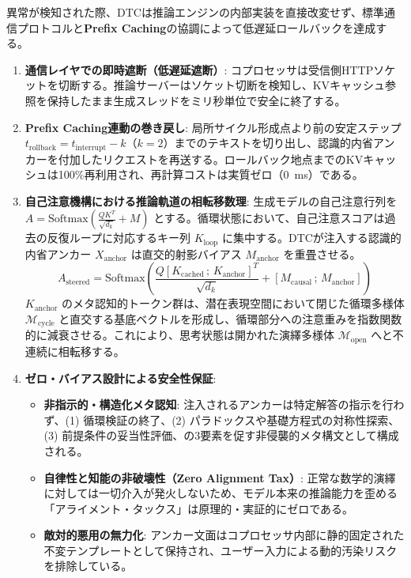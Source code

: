 \documentclass[11pt,a4paper]{article}
\begin{document}
異常が検知された際、DTCは推論エンジンの内部実装を直接改変せず、標準通信プロトコルと\textbf{Prefix Caching}の協調によって低遅延ロールバックを達成する。
\begin{enumerate}
    \item \textbf{通信レイヤでの即時遮断（低遅延遮断）}: コプロセッサは受信側HTTPソケットを切断する。推論サーバーはソケット切断を検知し、KVキャッシュ参照を保持したまま生成スレッドをミリ秒単位で安全に終了する。
    \item \textbf{Prefix Caching連動の巻き戻し}: 局所サイクル形成点より前の安定ステップ $t_{\mathrm{rollback}} = t_{\mathrm{interrupt}} - k$（$k=2$）までのテキストを切り出し、認識的内省アンカーを付加したリクエストを再送する。ロールバック地点までのKVキャッシュは100\%再利用され、再計算コストは実質ゼロ（0~ms）である。
    \item \textbf{自己注意機構における推論軌道の相転移数理}: 生成モデルの自己注意行列を $A = \mathrm{Softmax}\left(\frac{QK^T}{\sqrt{d_k}} + M\right)$ とする。循環状態において、自己注意スコアは過去の反復ループに対応するキー列 $K_{\mathrm{loop}}$ に集中する。DTCが注入する認識的内省アンカー $X_{\mathrm{anchor}}$ は直交的射影バイアス $M_{\mathrm{anchor}}$ を重畳させる。
    \begin{equation}
    A_{\mathrm{steered}} = \mathrm{Softmax}\left(\frac{Q [K_{\mathrm{cached}} \,;\, K_{\mathrm{anchor}}]^T}{\sqrt{d_k}} + [M_{\mathrm{causal}} \,;\, M_{\mathrm{anchor}}]\right)
    \end{equation}
    $K_{\mathrm{anchor}}$ のメタ認知的トークン群は、潜在表現空間において閉じた循環多様体 $\mathcal{M}_{\mathrm{cycle}}$ と直交する基底ベクトルを形成し、循環部分への注意重みを指数関数的に減衰させる。これにより、思考状態は開かれた演繹多様体 $\mathcal{M}_{\mathrm{open}}$ へと不連続に相転移する。
    \item \textbf{ゼロ・バイアス設計による安全性保証}:
    \begin{itemize}
        \item \textbf{非指示的・構造化メタ認知}: 注入されるアンカーは特定解答の指示を行わず、(1) 循環検証の終了、(2) パラドックスや基礎方程式の対称性探索、(3) 前提条件の妥当性評価、の3要素を促す非侵襲的メタ構文として構成される。
        \item \textbf{自律性と知能の非破壊性（Zero Alignment Tax）}: 正常な数学的演繹に対しては一切介入が発火しないため、モデル本来の推論能力を歪める「アライメント・タックス」は原理的・実証的にゼロである。
        \item \textbf{敵対的悪用の無力化}: アンカー文面はコプロセッサ内部に静的固定された不変テンプレートとして保持され、ユーザー入力による動的汚染リスクを排除している。
    \end{itemize}
\end{enumerate}
\end{document}
